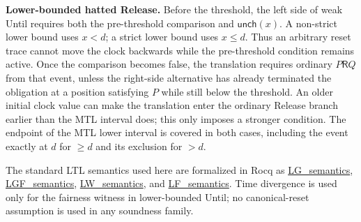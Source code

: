 \documentclass{ieeeaccess}
\newcommand{\Release}{\mathbin{\mathsf{R}}}
\newcommand{\Unch}{\mathsf{unch}}
\newcommand{\runinhead}[1]{\par\noindent\textbf{#1}\enspace}
\newcommand{\Rocqid}[1]{\url{#1}}
\begin{document}
\runinhead{Lower-bounded hatted Release.}
Before the threshold, the left side of weak Until requires both the
pre-threshold comparison and $\Unch(x)$. A non-strict lower bound uses
$x<d$; a strict lower bound uses $x\le d$. Thus an arbitrary reset trace
cannot move the clock backwards while the pre-threshold condition remains
active. Once the comparison becomes false, the translation requires ordinary
$P\Release Q$ from that event, unless the right-side alternative has already
terminated the obligation at a position satisfying $P$ while still below the
threshold. An older initial clock value can make the translation enter the
ordinary Release branch earlier than the MTL interval does; this only imposes
a stronger condition. The endpoint of the MTL lower interval is covered in
both cases, including the event exactly at $d$ for $\ge d$ and its exclusion
for $>d$.

The standard LTL semantics used here are formalized in Rocq as
\Rocqid{LG_semantics}, \Rocqid{LGF_semantics},
\Rocqid{LW_semantics}, and \Rocqid{LF_semantics}. Time divergence is used
only for the fairness witness in lower-bounded Until; no canonical-reset
assumption is used in any soundness family.
\end{document}
